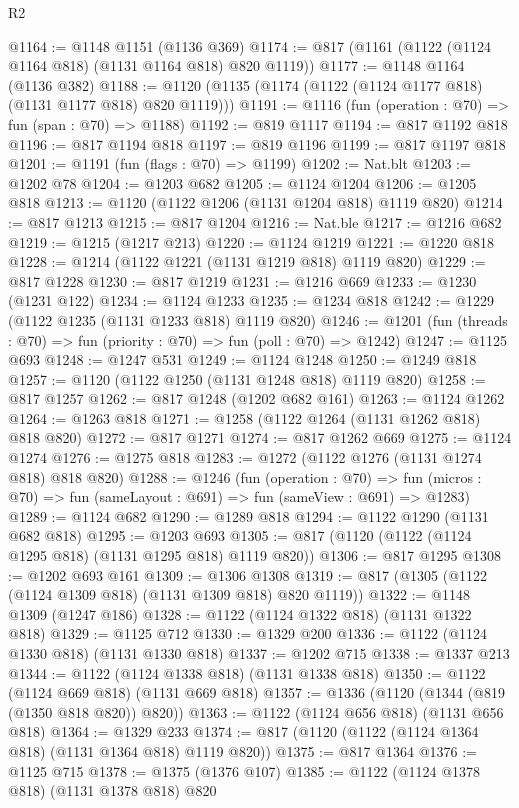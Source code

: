 \begin{lexlean}{R2}
\begin{coremodule}
@1164 := @1148 @1151 (@1136 @369)
@1174 := @817 (@1161 (@1122 (@1124 @1164 @818) (@1131 @1164 @818) @820 @1119))
@1177 := @1148 @1164 (@1136 @382)
@1188 := @1120 (@1135 (@1174 (@1122 (@1124 @1177 @818) (@1131 @1177 @818) @820 @1119)))
@1191 := @1116 (fun (operation : @70) => fun (span : @70) => @1188)
@1192 := @819 @1117
@1194 := @817 @1192 @818
@1196 := @817 @1194 @818
@1197 := @819 @1196
@1199 := @817 @1197 @818
@1201 := @1191 (fun (flags : @70) => @1199)
@1202 := Nat.blt
@1203 := @1202 @78
@1204 := @1203 @682
@1205 := @1124 @1204
@1206 := @1205 @818
@1213 := @1120 (@1122 @1206 (@1131 @1204 @818) @1119 @820)
@1214 := @817 @1213
@1215 := @817 @1204
@1216 := Nat.ble
@1217 := @1216 @682
@1219 := @1215 (@1217 @213)
@1220 := @1124 @1219
@1221 := @1220 @818
@1228 := @1214 (@1122 @1221 (@1131 @1219 @818) @1119 @820)
@1229 := @817 @1228
@1230 := @817 @1219
@1231 := @1216 @669
@1233 := @1230 (@1231 @122)
@1234 := @1124 @1233
@1235 := @1234 @818
@1242 := @1229 (@1122 @1235 (@1131 @1233 @818) @1119 @820)
@1246 := @1201 (fun (threads : @70) => fun (priority : @70) => fun (poll : @70) => @1242)
@1247 := @1125 @693
@1248 := @1247 @531
@1249 := @1124 @1248
@1250 := @1249 @818
@1257 := @1120 (@1122 @1250 (@1131 @1248 @818) @1119 @820)
@1258 := @817 @1257
@1262 := @817 @1248 (@1202 @682 @161)
@1263 := @1124 @1262
@1264 := @1263 @818
@1271 := @1258 (@1122 @1264 (@1131 @1262 @818) @818 @820)
@1272 := @817 @1271
@1274 := @817 @1262 @669
@1275 := @1124 @1274
@1276 := @1275 @818
@1283 := @1272 (@1122 @1276 (@1131 @1274 @818) @818 @820)
@1288 := @1246
    (fun (operation : @70) =>
    fun (micros : @70) => fun (sameLayout : @691) => fun (sameView : @691) => @1283)
@1289 := @1124 @682
@1290 := @1289 @818
@1294 := @1122 @1290 (@1131 @682 @818)
@1295 := @1203 @693
@1305 := @817 (@1120 (@1122 (@1124 @1295 @818) (@1131 @1295 @818) @1119 @820))
@1306 := @817 @1295
@1308 := @1202 @693 @161
@1309 := @1306 @1308
@1319 := @817 (@1305 (@1122 (@1124 @1309 @818) (@1131 @1309 @818) @820 @1119))
@1322 := @1148 @1309 (@1247 @186)
@1328 := @1122 (@1124 @1322 @818) (@1131 @1322 @818)
@1329 := @1125 @712
@1330 := @1329 @200
@1336 := @1122 (@1124 @1330 @818) (@1131 @1330 @818)
@1337 := @1202 @715
@1338 := @1337 @213
@1344 := @1122 (@1124 @1338 @818) (@1131 @1338 @818)
@1350 := @1122 (@1124 @669 @818) (@1131 @669 @818)
@1357 := @1336 (@1120 (@1344 (@819 (@1350 @818 @820)) @820))
@1363 := @1122 (@1124 @656 @818) (@1131 @656 @818)
@1364 := @1329 @233
@1374 := @817 (@1120 (@1122 (@1124 @1364 @818) (@1131 @1364 @818) @1119 @820))
@1375 := @817 @1364
@1376 := @1125 @715
@1378 := @1375 (@1376 @107)
@1385 := @1122 (@1124 @1378 @818) (@1131 @1378 @818) @820

\end{coremodule}
\end{lexlean}

